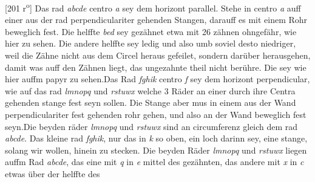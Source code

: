                 \vspace*{8mm}
                \pstart 
                \normalsize
            [201 r\textsuperscript{o}] Das rad \textit{abcde} centro \textit{a} sey dem horizont parallel. Stehe in centro \textit{a} auff einer aus der rad perpendiculariter gehenden Stangen, darauff es mit einem Rohr beweglich fest. Die helffte \textit{bed} sey gez\"{a}hnet etwa mit 26 z\"{a}hnen ohngef\"{a}hr, wie hier zu sehen. Die andere helffte sey ledig und also umb soviel desto niedriger, weil die Z\"{a}hne nicht aus dem Circel heraus gefeilet, sondern dar\"{u}ber herausgehen, damit was auff den Z\"{a}hnen liegt, das ungezahnte theil nicht ber\"{u}hre.  Die  sey wie hier auffm papyr zu sehen.\pend \pstart Das Rad \textit{fghik} centro \textit{f} sey dem horizont perpendicular, wie auf das rad \textit{lmnopq} und \textit{rstuwx} welche 3 R\"{a}der an einer durch ihre Centra gehenden stange fest seyn sollen. Die Stange aber mus in einem aus der Wand perpendiculariter fest gehenden rohr gehen, und also an der Wand beweglich fest seyn.\pend \pstart Die beyden r\"{a}der \textit{lmnopq} und \textit{rstuwx} sind an circumferenz gleich dem rad \textit{abcde}. Das kleine rad \textit{fghik}, nur das in \textit{k} so oben, ein loch darinn sey, eine stange, solang wir wollen, hinein zu stecken. \pend \pstart Die beyden R\"{a}der \textit{lmnopq} und \textit{rstuwx} liegen auffm Rad \textit{abcde}, das eine mit \textit{q} in \textit{e}  mittel des gez\"{a}hnten, das andere mit \textit{x} in \textit{c} etwas \"{u}ber der helffte des
